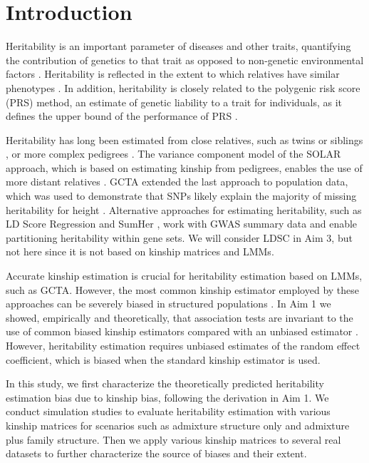 \documentclass[11pt]{article}
\begin{document}


\clearpage
	
\section{Introduction}

Heritability is an important parameter of diseases and other traits, quantifying the contribution of genetics to that trait as opposed to non-genetic environmental factors \citep{lush1949heritability}. Heritability is reflected in the extent to which relatives have similar phenotypes \citep{visscher2008heritability}. In addition, heritability is closely related to the polygenic risk score (PRS) method, an estimate of genetic liability to a trait for individuals, as it defines the upper bound of the performance of PRS \citep{choi2020tutorial}. 

Heritability has long been estimated from close relatives, such as twins or siblings \citep{falconer1996introduction}, or more complex pedigrees \citep{almasy_multipoint_1998}. The variance component model of the SOLAR approach, which is based on estimating kinship from pedigrees, enables the use of more distant relatives \citep{almasy_multipoint_1998}. GCTA extended the last approach to population data, which was used to demonstrate that SNPs likely explain the majority of missing heritability for height \citep{yang_common_2010,yang_gcta:_2011}. Alternative approaches for estimating heritability, such as LD Score Regression \citep{bulik2015ld,luo2021estimating} and SumHer \citep{speed2019sumher}, work with GWAS summary data and enable partitioning heritability within gene sets. We will consider LDSC in Aim 3, but not here since it is not based on kinship matrices and LMMs.

Accurate kinship estimation is crucial for heritability estimation based on LMMs, such as GCTA. However, the most common kinship estimator employed by these approaches can be severely biased in structured populations \citep{ochoa_estimating_2021}.  In Aim 1 we showed, empirically and theoretically, that association tests are invariant to the use of common biased kinship estimators compared with an unbiased estimator \citep{hou2023genetic}. However, heritability estimation requires unbiased estimates of the random effect coefficient, which is biased when the standard kinship estimator is used. 

In this study, we first characterize the theoretically predicted heritability estimation bias due to kinship bias, following the derivation in Aim 1. We conduct simulation studies to evaluate heritability estimation with various kinship matrices for scenarios such as admixture structure only and admixture plus family structure. Then we apply various kinship matrices to several real datasets to further characterize the source of biases and their extent.
\end{document}
